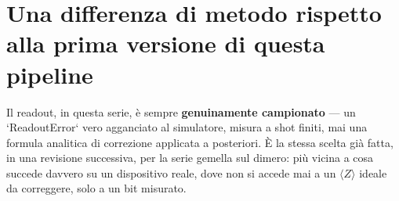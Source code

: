 \documentclass[11pt,a4paper]{article}
\begin{document}
\section{Una differenza di metodo rispetto alla prima versione di questa
pipeline}

Il readout, in questa serie, è sempre \textbf{genuinamente campionato} ---
un `ReadoutError` vero agganciato al simulatore, misura a shot finiti, mai
una formula analitica di correzione applicata a posteriori. È la stessa
scelta già fatta, in una revisione successiva, per la serie gemella sul
dimero: più vicina a cosa succede davvero su un dispositivo reale, dove non
si accede mai a un $\langle Z\rangle$ ideale da correggere, solo a un bit
misurato.

\end{document}
